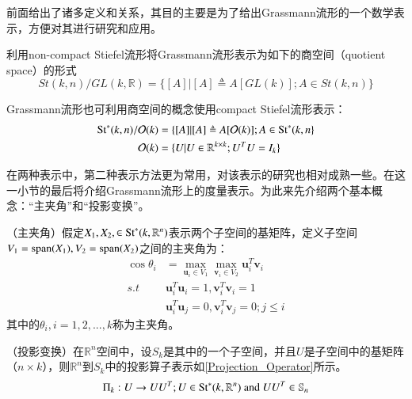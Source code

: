 前面给出了诸多定义和关系，其目的主要是为了给出Grassmann流形的一个数学表示，方便对其进行研究和应用。
\begin{repr}
\label{non-compact-repr}
利用non-compact Stiefel流形将Grassmann流形表示为如下的商空间（quotient space）的形式
\begin{equation}
St(k,n)/GL(k,\mathbb{R})=\{[A]|[A]\triangleq A[GL(k)];A\in St(k,n)\}
\end{equation}
\end{repr}
\begin{repr}
\label{compact-repr}
Grassmann流形也可利用商空间的概念使用compact Stiefel流形表示：
\begin{equation}
\begin{split}
{\rm St}^{*}(k,n)/{\mathcal{O}}(k)&=\{[A]|[A]\triangleq A[\mathcal{O}(k)];A\in {\rm St}^{*}(k,n\}\\
\mathcal{O}(k)&=\{U|U\in \mathbb{R}^{k\times k};U^{T}U=I_k\}
\end{split}
\end{equation}
\end{repr}
在两种表示中，第二种表示方法更为常用，对该表示的研究也相对成熟一些。在这一小节的最后将介绍Grassmann流形上的度量表示。为此来先介绍两个基本概念：“主夹角”和“投影变换”。
\begin{definition}
\label{Principle_Angle}
{\heiti （主夹角）}假定$X_1,X_2,\in {\rm St}^{*}(k,\mathbb{R}^{n})$表示两个子空间的基矩阵，定义子空间$V_1={\rm{span}}(X_1),V_2={\rm{span}}(X_2)$之间的主夹角为：
\begin{equation}
\begin{split}
\cos\theta_i&=\max_{\bm{u}_i\in V_1}\max_{\bm{v}_i \in V_2}\bm{u}_{i}^{T}\bm{v}_i\\
s.t~~~~& \bm{u}_{i}^{T}\bm{u}_i=1,\bm{v}_{i}^{T}\bm{v}_i=1\\
~~~& \bm{u}_{i}^{T}\bm{u}_j=0,\bm{v}_{i}^{T}\bm{v}_j=0;j \leq i
\end{split}
\end{equation}
其中的$\theta_i,i=1,2,...,k$称为主夹角。
\end{definition}
\begin{definition}
\label{Projection}
{\heiti （投影变换）}在$\mathbb{R}^{n}$空间中，设$S_k$是其中的一个子空间，并且$U$是子空间中的基矩阵（$n \times k$），则$\mathbb{R}^{n}$到$S_k$中的投影算子表示如\ref{Projection_Operator}所示。
\begin{equation}
\label{Projection_Operator}
\Pi_k:U\rightarrow UU^{T};U \in {\rm St}^*(k,\mathbb{R}^n)\text{ and }UU^{T} \in \mathbb{S}_n
\end{equation}
\end{definition}
